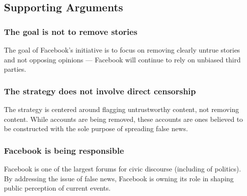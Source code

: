 \subsection{Supporting Arguments}

\subsubsection{The goal is not to remove stories}

\par The goal of Facebook's initiative is to focus on removing clearly untrue stories and not opposing opinions --- Facebook will continue to rely on unbiased third parties. \cite{tc_downranks}

\subsubsection{The strategy does not involve direct censorship}

\par The strategy is centered around flagging untrustworthy content, not removing content. While accounts are being removed, these accounts are ones believed to be constructed with the sole purpose of spreading false news. \cite{tc_downranks}

\subsubsection{Facebook is being responsible}

\par Facebook is one of the largest forums for civic discourse (including of politics). By addressing the issue of false news, Facebook is owning its role in shaping public perception of current events. \cite{cnn_fight}

%
